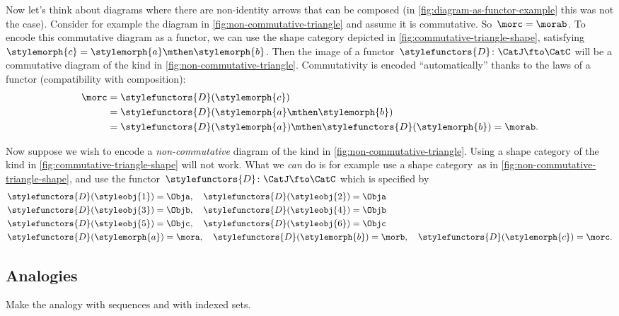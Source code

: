 Now let's think about diagrams where there are non-identity arrows that can be composed (in \cref{fig:diagram-as-functor-example} this was not the case).
Consider for example the diagram in \cref{fig:non-commutative-triangle} and assume it is commutative.
So~$\morc = \morab$.
To encode this commutative diagram as a functor, we can use the shape category depicted in \cref{fig:commutative-triangle-shape}, satisfying~$\stylemorph{c} = \stylemorph{a} \mthen \stylemorph{b}$.
Then the image of a functor~$\stylefunctors{D}\colon \CatJ \fto \CatC$ will be a commutative diagram of the kind in \cref{fig:non-commutative-triangle}.
Commutativity is encoded ``automatically'' thanks to the laws of a functor (compatibility with composition):
\begin{align}
    \morc & = \stylefunctors{D}(\stylemorph{c}) \\
          & = \stylefunctors{D}(\stylemorph{a} \mthen \stylemorph{b}) \\
          & = \stylefunctors{D}(\stylemorph{a}) \mthen \stylefunctors{D}(\stylemorph{b}) = \morab.
\end{align}

\begin{marginfigure}
    \centering
    \caption{}
    \label{fig:non-commutative-triangle-shape}
\end{marginfigure}

Now suppose we wish to encode a \emph{non-commutative} diagram of the kind in \cref{fig:non-commutative-triangle}.
Using a shape category of the kind in \cref{fig:commutative-triangle-shape} will not work.
What we \emph{can} do is for example use a shape category~\CatJ as in \cref{fig:non-commutative-triangle-shape}, and use the functor~$\stylefunctors{D}\colon \CatJ \fto \CatC$ which is specified by
\begin{align}
     & \stylefunctors{D}(\styleobj{1}) = \Obja, \quad \stylefunctors{D}(\styleobj{2}) = \Obja \\
     & \stylefunctors{D}(\styleobj{3}) = \Objb, \quad \stylefunctors{D}(\styleobj{4}) = \Objb \\
     & \stylefunctors{D}(\styleobj{5}) = \Objc, \quad \stylefunctors{D}(\styleobj{6}) = \Objc \\
     & \stylefunctors{D}(\stylemorph{a}) = \mora, \quad \stylefunctors{D}(\stylemorph{b}) = \morb, \quad \stylefunctors{D}(\stylemorph{c}) = \morc.
\end{align}

\subsection{Analogies}

Make the analogy with sequences and with indexed sets.

\XXX


